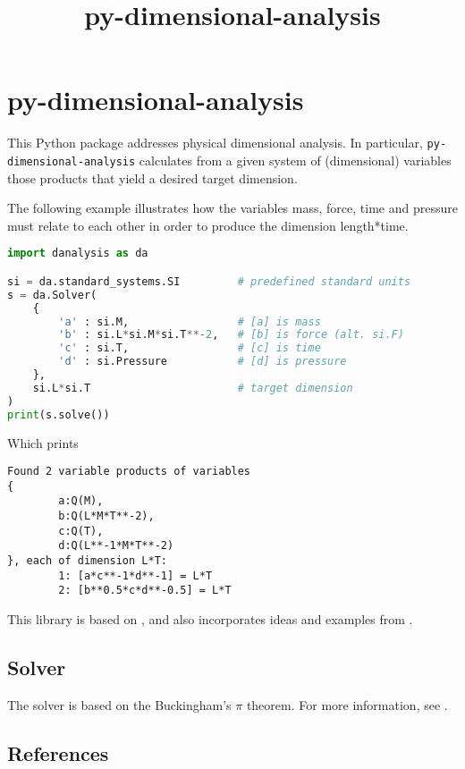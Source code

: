 \documentclass[11pt]{article}
\title{py-dimensional-analysis}
\date{}
\begin{document}
\maketitle

\section{py-dimensional-analysis}
This Python package addresses physical dimensional analysis. In particular, \texttt{py-dimensional-analysis} calculates from a given system of (dimensional) variables those products that yield a desired target dimension.


The following example illustrates how the variables mass, force, time and pressure must relate to each other in order to produce the dimension length*time.

\begin{lstlisting}[language=Python]
import danalysis as da

si = da.standard_systems.SI         # predefined standard units
s = da.Solver(
    {
        'a' : si.M,                 # [a] is mass
        'b' : si.L*si.M*si.T**-2,   # [b] is force (alt. si.F)
        'c' : si.T,                 # [c] is time
        'd' : si.Pressure           # [d] is pressure
    },
    si.L*si.T                       # target dimension
)
print(s.solve())
\end{lstlisting}
Which prints
\begin{lstlisting}
Found 2 variable products of variables
{
        a:Q(M),
        b:Q(L*M*T**-2),
        c:Q(T),
        d:Q(L**-1*M*T**-2)
}, each of dimension L*T:
        1: [a*c**-1*d**-1] = L*T
        2: [b**0.5*c*d**-0.5] = L*T
\end{lstlisting}

This library is based on \cite{szirtes2007applied}, and also incorporates ideas and examples from \cite{santiago2019first, sonin2001dimensional}.

\subsection{Solver}
The solver is based on the Buckingham's $\pi$ theorem. For more information, see \cite{szirtes2007applied}.

\subsection{References}

\begingroup
\renewcommand{\section}[2]{}%

\endgroup
\end{document}
